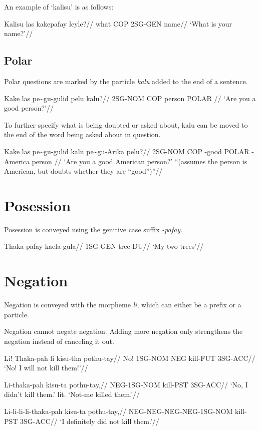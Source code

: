 An example of `kalisu' is as follows:

\ex
\begingl
    \gla  Kalisu las kakepafay leyle?//
    \glb  what COP 2SG-GEN name//
    \glft`What is your name?'//
\endgl
\xe


\subsection{Polar}
Polar questions are marked by the particle \emph{kalu} added to the end of a sentence.

\ex
\begingl
    \gla  Kake las pe\~{}gu-gulid pelu kalu?//
    \glb  2SG-NOM COP \agradj{} person POLAR //
    \glft`Are you a good person?'//
\endgl
\xe


To further specify what is being doubted or asked about, kalu can be moved to the end of the word being asked about in question.

\ex
\begingl
\gla  Kake las pe\~{}gu-gulid kalu pe\~{}gu-Arika pelu?//
\glb  2SG-NOM COP \agradj{}-good POLAR \agradj{}-America person //
\glft `Are you a good American person?' ``(assumes the person is American, but doubts whether they are ``good'')''//
\endgl
\xe


\section{Posession}
Posession is conveyed using the genitive case suffix \emph{-pafay}.

\ex
\begingl
    \gla  Thaka-pafay kaela-gula//
    \glb  1SG-GEN tree-DU//
    \glft `My two trees'//
\endgl
\xe


\section{Negation}
Negation is conveyed with the morpheme \emph{li}, which can either be a prefix or a particle.

Negation cannot negate negation.
Adding more negation only strengthens the negation instead of canceling it out.

\ex
\begingl
    \gla  Li! Thaka-pah li kisu-tha pothu-tay//
    \glb  No! 1SG-NOM NEG kill-FUT 3SG-ACC//
    \glft `No! I will not kill them!'//
\endgl
\xe


\ex
\begingl
    \gla  Li-thaka-pah kisu-ta pothu-tay,//
    \glb  NEG-1SG-NOM kill-PST 3SG-ACC//
    \glft `No, I didn't kill them.' lit. `Not-me killed them.'//
\endgl
\xe

\ex
\begingl
    \gla  Li-li-li-li-thaka-pah kisu-ta pothu-tay,//
    \glb  NEG-NEG-NEG-NEG-1SG-NOM kill-PST 3SG-ACC//
    \glft `I definitely did not kill them.'//
\endgl
\xe

